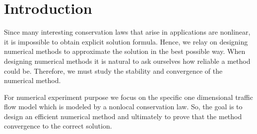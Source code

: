\section{Introduction}
Since many interesting conservation laws that arise in applications are nonlinear, it is impossible to obtain explicit solution formula.
Hence, we relay on designing numerical methods to approximate the solution in the best possible way.
When designing numerical methods it is natural to ask ourselves how reliable a method could be.
Therefore, we must study the stability and convergence of the numerical method.

For numerical experiment purpose we focus on the specific one dimensional traffic flow model which is
modeled by a nonlocal conservation law. So, the goal is to design an efficient numerical method and ultimately
to prove that the method convergence to the correct solution.
